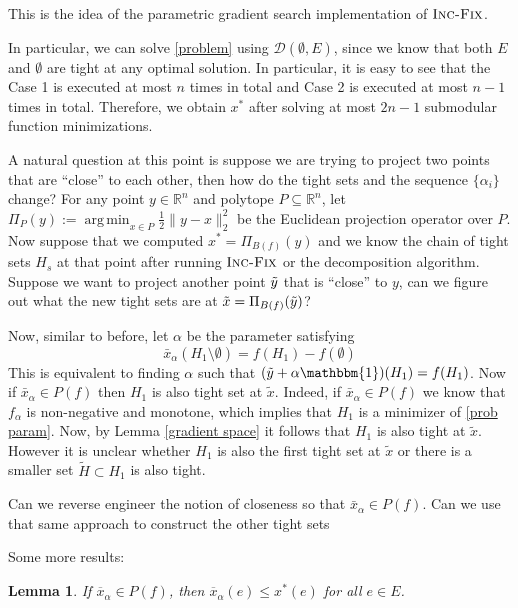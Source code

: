 \documentclass{article}
\newtheorem{lemma}{Lemma}
\DeclareMathOperator*{\argmin}{arg\,min}
\begin{document}
This is the idea of the parametric gradient search implementation of $\textsc{Inc-Fix}$. 

In particular, we can solve \eqref{problem} using $\mathcal{D}(\emptyset, E)$, since we know that both $E$ and $\emptyset$ are tight at any optimal solution. In particular, it is easy to see that the Case 1 is executed at most $n$ times in total and Case 2 is executed at most $n - 1$ times in total. Therefore, we obtain $x^*$ after solving at most $2n - 1$ submodular function
minimizations.

A natural question at this point is suppose we are trying to project two points that are ``close'' to each other, then how do the tight sets and the sequence $\{\alpha_i\}$  change? For any point $y \in \mathbb{R}^n$ and polytope $P \subseteq \mathbb{R}^n$, let $\Pi_P(y) := \argmin_{x \in P} \frac{1}{2}\| y - x\|_2^2$ be the Euclidean projection operator over $P$. Now suppose that we computed $x^* = \Pi_{B(f)}(y)$ and we know the chain of tight sets $H_s$ at that point after running $\textsc{Inc-Fix}$ or the decomposition algorithm. Suppose we want to project another point $\Tilde{y}$ that is ``close'' to $y$, can we figure out what the new tight sets are at $\tilde{x} = \Pi_{B(f)}(\Tilde{y})$?

Now, similar to before, let $\alpha$ be the parameter satisfying 
\begin{equation*}
    \bar{x}_\alpha (H_1 \setminus \emptyset) = f (H_1) - f(\emptyset)
\end{equation*}
This is equivalent to finding $\alpha$ such that $(\Tilde{y} + \alpha \mathbbm{1})(H_1) = f(H_1)$. Now if $\bar{x}_\alpha \in P(f)$ then $H_1$ is also tight set at $\tilde{x}$. Indeed, if $\bar{x}_\alpha \in P(f)$ we know that $f_\alpha$ is non-negative and monotone, which implies that $H_1$ is a minimizer of \eqref{prob param}. Now, by Lemma \ref{gradient space} it follows that $H_1$ is also tight at $\tilde{x}$. However it is unclear whether $H_1$ is also the first tight set at $\tilde{x}$ or there is a smaller set $\tilde{H} \subset H_1 $ is also tight. 

Can we reverse engineer the notion of closeness so that $\bar{x}_\alpha \in P(f)$. Can we use that same approach to construct the other tight sets

Some more results:
\begin{lemma}
    If $\overline{x}_\alpha \in P(f)$, then $\overline{x}_\alpha(e) \le x^*(e)$ for all $e \in E$.
\end{lemma}
\end{document}
